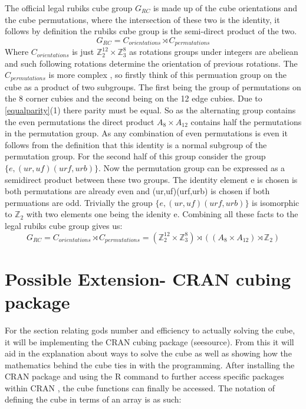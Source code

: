\documentclass{article}
\begin{document}
The official legal rubiks cube group $G_{RC}$ is made up of the cube orientations and the cube permutations, where the intersection of these two is the identity, it follows by definition the rubiks cube group is the semi-direct product of the two. 
\begin{equation}
G_{RC} = C_{orientations} \rtimes C_{permutations}
\end{equation}
Where $C_{orientations}$ is just $\mathbb{Z}_{2}^{12} \times \mathbb{Z}_{3}^{8}$ as rotations groups under integers are abeliean and such following rotations determine the orientation of previous rotations. 
The $C_{permutations}$ is more complex , so firstly think of this permuation group on the cube as a product of two subgroups. The first being the group of permutations on the 8 corner cubies and the second being on the 12 edge cubies. Due to \ref{equalparity}(1) there parity must be equal. So as the alternating group contains the even permutations the direct product $A_8 \times A_{12}$ contains half the permutations in the permutation group. As any combination of even permutations is even it follows from the definition that this identity is a normal subgroup of the permutation group.
For the second half of this group consider the group $\{e,(ur,uf)(urf,urb)\}$. Now the permutation group can be expressed as a semidirect product between these two groups. The identity element e is chosen is both permutations are already even and (ur,uf)(urf,urb) is chosen if both permuations are odd\cite{final}. Trivially the group $\{e,(ur,uf)(urf,urb)\}$ is isomorphic to $\mathbb{Z}_2$ with two elements one being the idenity e. Combining all these facts to the legal rubiks cube group gives us: 
\begin{equation}
G_{RC} = C_{orientations} \rtimes C_{permutations} = (\mathbb{Z}_{2}^{12} \times \mathbb{Z}_{3}^{8}) \rtimes ((A_8 \times A_{12})\rtimes \mathbb{Z}_2)
\end{equation} 


\newpage
\section{Possible Extension- CRAN cubing package}

For the section relating gods number and efficiency to actually solving the cube, it will be implementing the CRAN cubing package (seesource). From this it will
aid in the explanation about ways to solve the cube as well as showing how the mathematics behind the cube ties in with the programming.
After installing the CRAN package and using the R command to further access specific packages within CRAN , the cube functions can finally be accessed. The notation of defining the cube in terms of an array is as such:
\end{document}
